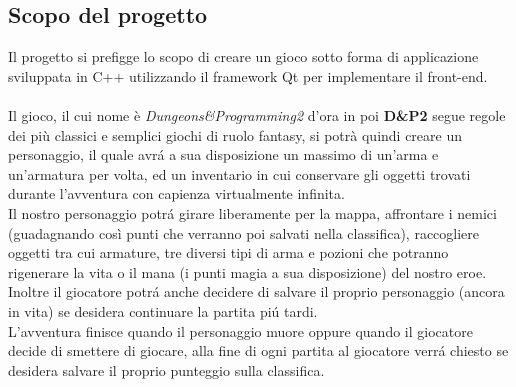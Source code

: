 \documentclass[../relazione.tex]{subfiles}
\begin{document}
\subsection{Scopo del progetto}
\label{ssec:scopo-progetto}
Il progetto si prefigge lo scopo di creare un gioco sotto forma di applicazione sviluppata in C++ utilizzando il framework Qt per implementare il front-end.\\ \\
Il gioco, il cui nome è \textit{Dungeons\&Programming2} d'ora in poi \textbf{D\&P2} segue regole dei più classici e semplici giochi di ruolo fantasy, si potrà quindi
creare un personaggio, il quale avrá a sua disposizione un massimo di un'arma e un'armatura per volta, ed un inventario in cui conservare gli oggetti trovati durante
l'avventura con capienza virtualmente infinita.\\
Il nostro personaggio potrá girare liberamente per la mappa, affrontare i nemici (guadagnando così punti che verranno poi salvati nella classifica), raccogliere oggetti
tra cui armature, tre diversi tipi di arma e pozioni che potranno rigenerare la vita o il mana (i punti magia a sua disposizione) del nostro eroe.\\
Inoltre il giocatore potrá anche decidere di salvare il proprio personaggio (ancora in vita) se desidera continuare la partita piú tardi.\\
L'avventura finisce quando il personaggio muore oppure quando il giocatore decide di smettere di giocare, alla fine di ogni partita al giocatore verrá chiesto se desidera salvare il proprio punteggio sulla classifica.
\end{document}
